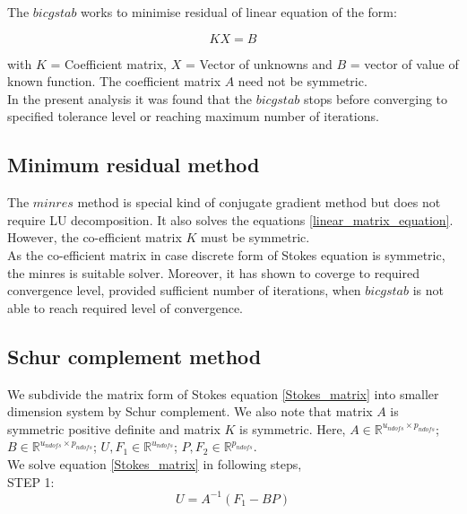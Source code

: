 \documentclass[a4paper]{book}
\begin{document}
The $bicgstab$ works to minimise residual of linear equation of the form:

\begin{equation} \label{linear_matrix_equation}
KX = B
\end{equation}

with $K$ = Coefficient matrix, $X$ = Vector of unknowns and $B$ = vector of value of known function. The coefficient matrix $A$ need not be symmetric. \\

In the present analysis it was found that the $bicgstab$ stops before converging to specified tolerance level or reaching maximum number of iterations. 

\subsection{Minimum residual method} 

The $minres$ method is special kind of conjugate gradient method but does not require LU decomposition. It also solves the equations \ref{linear_matrix_equation}. However, the co-efficient matrix $K$ must be symmetric. \\

As the co-efficient matrix in case discrete form of Stokes equation is symmetric, the minres is suitable solver. Moreover, it has shown to coverge to required convergence level, provided sufficient number of iterations, when $bicgstab$ is not able to reach required level of convergence.

\subsection{Schur complement method} \label{schur}

We subdivide the matrix form of Stokes equation \eqref{Stokes_matrix} into smaller dimension system by Schur complement. We also note that matrix $A$ is symmetric positive definite and matrix $K$ is symmetric.
Here, $A \in \mathbb{R}^{u_{ndofs} \times p_{ndofs}}$; $B \in \mathbb{R}^{u_{ndofs} \times p_{ndofs}}$; $U,F_1 \in \mathbb{R}^{u_{ndofs}}$; $P, F_2 \in \mathbb{R}^{p_{ndofs}}$. \\

We solve equation \eqref{Stokes_matrix} in following steps,\\

STEP 1: \\ 
\begin{equation}\label{schur step 1}
U = A^{-1}(F_1 - BP) 
\end{equation}
\end{document}
